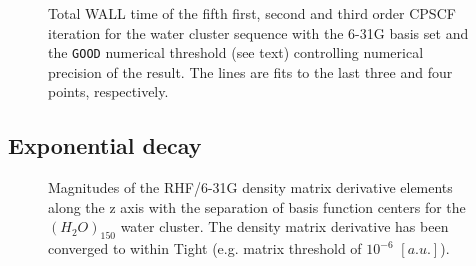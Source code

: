 \documentclass[twocolumn,showpacs,preprintnumbers,amsmath,amssymb]{revtex4}
\begin{document}
\begin{figure}[t]
  \caption{\protect
    Total WALL time of the fifth first, second and third order
    CPSCF iteration for the water cluster sequence with the 6-31G
    basis set and the {\tt GOOD} numerical threshold (see text) 
    controlling numerical precision of the result. The lines
    are fits to the last three and four points, respectively.
  }\label{Mix_scaling}
\end{figure}



\subsection{Exponential decay}

\begin{figure}[t]
  \caption{\protect
    Magnitudes of the RHF/6-31G density matrix derivative elements 
    along the z axis with the separation of basis function centers
    for the $(H_2O)_{150}$ water cluster. The density matrix 
    derivative has been converged to within Tight (e.g. 
    matrix threshold of $10^{-6}$ $[a.u.]$).
  }\label{fig:Alpha_Decay}
\end{figure}
\end{document}
